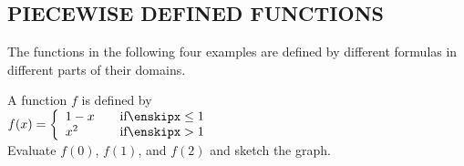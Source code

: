 \documentclass{sebase}
\begin{document}
\subsection{PIECEWISE DEFINED FUNCTIONS}

The functions in the following four examples are defined by different
formulas in different parts of their domains.

\begin{Example}[7]
\VIDEO%
%
A function $f$ is defined by \\[6pt]
\hspace*{\fill}$f(x)=\left\{ 
\begin{array}{ll}
1-x\quad  & \text{if}%
\enskip%
x\leq 1 \\ 
x^{2} & \text{if}%
\enskip%
x>1%
\end{array}%
\right. $\hspace*{\fill}\\[6pt]
Evaluate $f(0)$, $f(1)$, and $f(2)$ and sketch the graph.
\end{Example}
\end{document}
